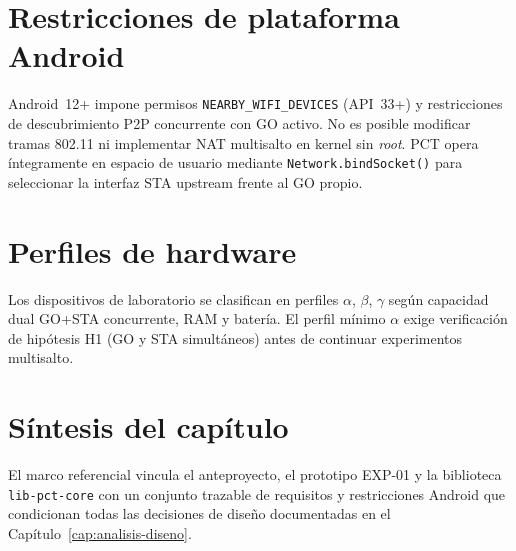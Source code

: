 \section{Restricciones de plataforma Android}
\label{sec:restricciones-android}

Android~12+ impone permisos \texttt{NEARBY\_WIFI\_DEVICES} (API~33+) y restricciones de descubrimiento P2P concurrente con GO activo. No es posible modificar tramas 802.11 ni implementar NAT multisalto en kernel sin \emph{root}. PCT opera íntegramente en espacio de usuario mediante \texttt{Network.bindSocket()} para seleccionar la interfaz STA upstream frente al GO propio.

\section{Perfiles de hardware}
\label{sec:perfiles-hardware}

Los dispositivos de laboratorio se clasifican en perfiles $\alpha$, $\beta$, $\gamma$ según capacidad dual GO+STA concurrente, RAM y batería. El perfil mínimo $\alpha$ exige verificación de hipótesis H1 (GO y STA simultáneos) antes de continuar experimentos multisalto.

\section{Síntesis del capítulo}
\label{sec:sintesis-marco-referencial}

El marco referencial vincula el anteproyecto, el prototipo EXP-01 y la biblioteca \texttt{lib-pct-core} con un conjunto trazable de requisitos y restricciones Android que condicionan todas las decisiones de diseño documentadas en el Capítulo~\ref{cap:analisis-diseno}.
